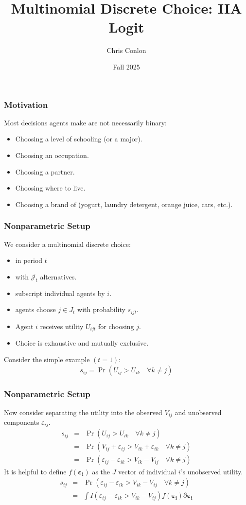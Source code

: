 \documentclass[aspectratio=169,11pt]{beamer}
\begin{document}
\title{Multinomial Discrete Choice: IIA Logit}
\author{Chris Conlon}
\date{Fall 2025}

\frame{\titlepage}


\begin{frame}
\frametitle{Motivation}
Most decisions agents make are not necessarily binary:
\begin{itemize}
\item Choosing a level of schooling (or a major).
\item Choosing an occupation.
\item Choosing a partner.
\item Choosing where to live.
\item Choosing a brand of (yogurt, laundry detergent, orange juice, cars, etc.).
 \end{itemize}
\end{frame}

\begin{frame}
\frametitle{Nonparametric Setup}
We consider a \alert{multinomial discrete choice}:
\begin{itemize}
\item in period $t$
\item with $\mathcal{J}_t$ alternatives.
\item subscript individual agents by $i$.
\item agents choose $j \in J_t$ with probability $s_{ijt}$.
\item Agent $i$ receives utility $U_{ijt}$ for choosing $j$.
\item Choice is exhaustive and mutually exclusive.
 \end{itemize}\pause
Consider the simple example $(t=1)$:
\begin{eqnarray*}
s_{ij} = \Pr( U_{ij} > U_{ik} \quad \forall k \neq j)
\end{eqnarray*}
\end{frame}

\begin{frame}
\frametitle{Nonparametric Setup}
Now consider separating the utility into the \alert{observed} $V_{ij}$ and \alert{unobserved} components $\varepsilon_{ij}$.
\begin{eqnarray*}
s_{ij} &=& \Pr( U_{ij} > U_{ik} \quad \forall k \neq j)\\
 &=& \Pr( V_{ij} + \varepsilon_{ij} > V_{ik} + \varepsilon_{ik} \quad \forall k \neq j)\\
 &=& \Pr( \varepsilon_{ij}-\varepsilon_{ik} > V_{ik} - V_{ij} \quad \forall k \neq j)
\end{eqnarray*}
\pause
It is helpful to define $f(\boldsymbol{\varepsilon_{i}})$ as the $J$ vector of individual $i$'s unobserved utility.
\begin{eqnarray*}
s_{ij} &=& \Pr( \varepsilon_{ij}-\varepsilon_{ik} > V_{ik} - V_{ij} \quad \forall k \neq j)\\
&=& \int I( \varepsilon_{ij}-\varepsilon_{ik} > V_{ik} - V_{ij} ) f( \boldsymbol{\varepsilon_i}) \partial \boldsymbol{\varepsilon_i} \\
\end{eqnarray*}
\end{frame}
\end{document}
